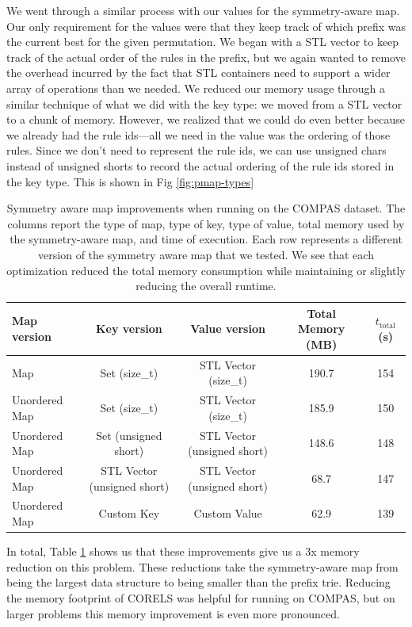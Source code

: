 We went through a similar process with our values for the symmetry-aware map.
Our only requirement for the values were that they keep track of which prefix was the current best for the given permutation.
We began with a STL vector to keep track of the actual order of the rules in the prefix, but we again wanted to remove the overhead incurred by the fact that STL containers need to support a wider array of operations than we needed.
We reduced our memory usage through a similar technique of what we did with the key type: we moved from a STL vector to a chunk of memory.
However, we realized that we could do even better because we already had the rule ids---all we need in the value was the ordering of those rules.
Since we don't need to represent the rule ids, we can use unsigned chars instead of unsigned shorts to record the actual ordering of the rule ids stored in the key type.
This is shown in Fig \ref{fig:pmap-types}

\begin{table}[t!]
\begin{tabular}{l | c | c | c | c }
Map version & Key version & Value version & Total Memory (MB) & $t_\text{total}$ (s)\\
\hline
Map & Set (size\_t) & STL Vector (size\_t) & 190.7 & 154 \\
Unordered Map & Set (size\_t) & STL Vector (size\_t) & 185.9 & 150 \\
Unordered Map & Set  (unsigned short) & STL Vector (unsigned short) & 148.6 & 148 \\
Unordered Map & STL Vector (unsigned short) & STL Vector (unsigned short) & 68.7 & 147 \\
Unordered Map & Custom Key & Custom Value & 62.9 & 139 \\
\end{tabular}
\vspace{4mm}
\caption{Symmetry aware map improvements when running on the COMPAS dataset.
%
The columns report the type of map,
type of key, type of value,
total memory used by the symmetry-aware map, and time of execution.
%
Each row represents a different version of the symmetry aware map that we tested.
We see that each optimization reduced the total memory consumption while maintaining or slightly reducing the overall runtime.
}
\label{tab:pmap}
\end{table}

In total, Table \ref{tab:pmap} shows us that these improvements give us a 3x memory reduction on this problem.
These reductions take the symmetry-aware map from being the largest data structure to being smaller than the prefix trie.
Reducing the memory footprint of CORELS was helpful for running on COMPAS, but on larger problems this memory improvement is even more pronounced.

